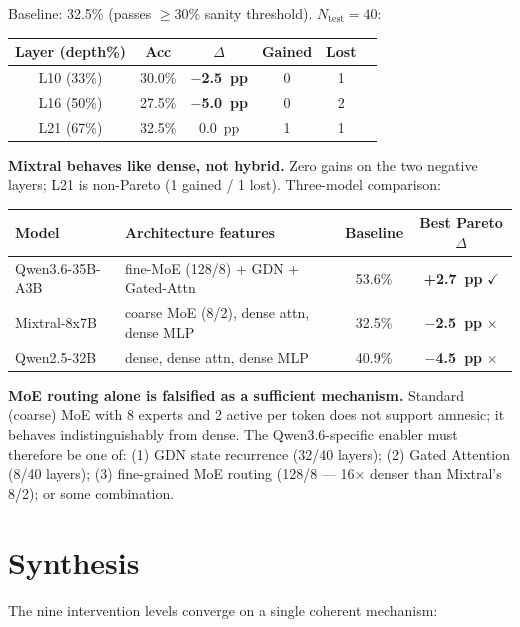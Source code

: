 \documentclass[11pt]{article}
\begin{document}
Baseline: 32.5\% (passes $\geq$30\% sanity threshold). $N_\text{test} = 40$:

\begin{table}[h]
\centering
\begin{tabular}{cccccc}
\toprule
Layer (depth\%) & Acc & $\Delta$ & Gained & Lost \\
\midrule
L10 (33\%) & 30.0\% & \textbf{$-$2.5~pp} & 0 & 1 \\
L16 (50\%) & 27.5\% & \textbf{$-$5.0~pp} & 0 & 2 \\
L21 (67\%) & 32.5\% & 0.0~pp & 1 & 1 \\
\bottomrule
\end{tabular}
\end{table}

\textbf{Mixtral behaves like dense, not hybrid.} Zero gains on the two negative layers; L21 is non-Pareto (1 gained / 1 lost). Three-model comparison:

\begin{center}
\begin{tabular}{llcc}
\toprule
Model & Architecture features & Baseline & Best Pareto $\Delta$ \\
\midrule
Qwen3.6-35B-A3B & fine-MoE (128/8) + GDN + Gated-Attn & 53.6\% & \textbf{+2.7~pp} $\checkmark$ \\
Mixtral-8x7B & coarse MoE (8/2), dense attn, dense MLP & 32.5\% & \textbf{$-$2.5~pp} $\times$ \\
Qwen2.5-32B & dense, dense attn, dense MLP & 40.9\% & \textbf{$-$4.5~pp} $\times$ \\
\bottomrule
\end{tabular}
\end{center}

\textbf{MoE routing alone is falsified as a sufficient mechanism.} Standard (coarse) MoE with 8 experts and 2 active per token does not support amnesic; it behaves indistinguishably from dense. The Qwen3.6-specific enabler must therefore be one of: (1) GDN state recurrence (32/40 layers); (2) Gated Attention (8/40 layers); (3) fine-grained MoE routing (128/8 --- 16$\times$ denser than Mixtral's 8/2); or some combination.

\section{Synthesis}

The nine intervention levels converge on a single coherent mechanism:
\end{document}
